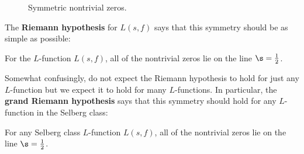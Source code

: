     \begin{figure}[ht]
      \centering
      \caption{Symmetric nontrivial zeros.}
      \label{fig:symmetric_nontrivial_zeros}
    \end{figure}

    The \textbf{Riemann hypothesis} for $L(s,f)$ says that this symmetry should be as simple as possible:

    \begin{conjecture}
      For the $L$-function $L(s,f)$, all of the nontrivial zeros lie on the line $\s = \frac{1}{2}$.
    \end{conjecture}

    Somewhat confusingly, do not expect the Riemann hypothesis to hold for just any $L$-function but we expect it to hold for many $L$-functions. In particular, the \textbf{grand Riemann hypothesis} says that this symmetry should hold for any $L$-function in the Selberg class:

    \begin{conjecture}
      For any Selberg class $L$-function $L(s,f)$, all of the nontrivial zeros lie on the line $\s = \frac{1}{2}$.
    \end{conjecture}

